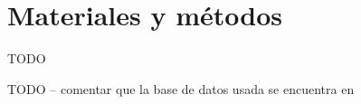 \section{Materiales y métodos} \label{seccion:MaterialesMetodos}

TODO



TODO -- comentar que la base de datos usada se encuentra en \cite{database:online}
